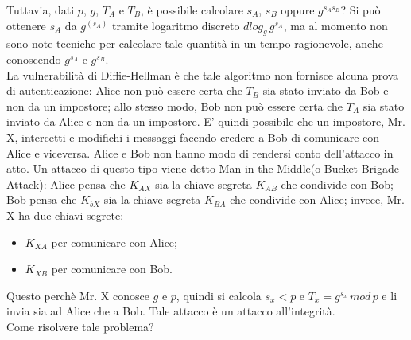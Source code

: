Tuttavia, dati $p$, $g$, $T_{A}$ e $T_{B}$, è possibile calcolare $s_{A}$, $s_{B}$ oppure $g^{s_{A}s_{B}}$? Si può ottenere $s_{A}$ da $g^(s_{A})$ tramite logaritmo discreto $dlog_{g} \, g^{s_{A}}$, ma al momento non sono note tecniche per calcolare tale quantità in un tempo ragionevole, anche conoscendo $g^{s_{A}}$ e $g^{s_{B}}$.
\\
La vulnerabilità di Diffie-Hellman è che tale algoritmo non fornisce alcuna prova di autenticazione: Alice non può essere certa che $T_{B}$ sia stato inviato da Bob e non da un impostore; allo stesso modo, Bob non può essere certa che $T_{A}$ sia stato inviato da Alice e non da
un impostore. E' quindi possibile che un impostore, Mr. X, intercetti e modifichi i messaggi facendo credere a Bob di comunicare con Alice e
viceversa. Alice e Bob non hanno modo di rendersi conto dell'attacco in atto. Un attacco di questo tipo viene detto Man-in-the-Middle(o Bucket Brigade Attack): Alice pensa che $K_{AX}$ sia la chiave segreta $K_{AB}$ che condivide con Bob; Bob pensa che $K_{bX}$ sia la chiave segreta $K_{BA}$ che condivide con Alice; invece, Mr. X ha due chiavi segrete: \begin{itemize}
\item $K_{XA}$ per comunicare con Alice;
\item $K_{XB}$ per comunicare con Bob.
\end{itemize}
Questo perchè Mr. X conosce $g$ e $p$, quindi si calcola $s_{x}<p$ e $T_{x}=g^{s_{x}} \, mod \, p$ e li invia sia ad Alice che a Bob. Tale attacco è un attacco all'integrità. \\
Come risolvere tale problema? 
